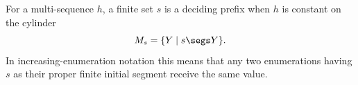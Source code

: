 \begin{definition}
For a multi-sequence $h$, a finite set $s$ is a deciding prefix when $h$ is
constant on the cylinder
\[
M_s=\{Y\mid s\segs Y\}.
\]
In increasing-enumeration notation this means that any two enumerations
having $s$ as their proper finite initial segment receive the same value.
\end{definition}
